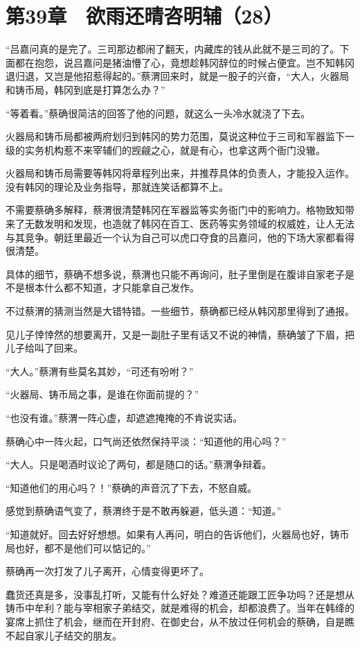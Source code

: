 \section{第39章　欲雨还晴咨明辅（28）}

“吕嘉问真的是完了。三司那边都闹了翻天，内藏库的钱从此就不是三司的了。下面都在抱怨，说吕嘉问是猪油懵了心，竟想趁韩冈辞位的时候占便宜。岂不知韩冈退归退，又岂是他招惹得起的。”蔡渭回来时，就是一股子的兴奋，“大人，火器局和铸币局，韩冈到底是打算怎么办？”

“等着看。”蔡确很简洁的回答了他的问题，就这么一头冷水就浇了下去。

火器局和铸币局都被两府划归到韩冈的势力范围，莫说这种位于三司和军器监下一级的实务机构惹不来宰辅们的觊觎之心，就是有心，也拿这两个衙门没辙。

火器局和铸币局需要等韩冈将章程列出来，并推荐具体的负责人，才能投入运作。没有韩冈的理论及业务指导，那就连笑话都算不上。

不需要蔡确多解释，蔡渭很清楚韩冈在军器监等实务衙门中的影响力。格物致知带来了无数发明和发现，也造就了韩冈在百工、医药等实务领域的权威姓，让人无法与其竞争。朝廷里最近一个认为自己可以虎口夺食的吕嘉问，他的下场大家都看得很清楚。

具体的细节，蔡确不想多说，蔡渭也只能不再询问，肚子里倒是在腹诽自家老子是不是根本什么都不知道，才只能拿自己发作。

不过蔡渭的猜测当然是大错特错。一些细节，蔡确都已经从韩冈那里得到了通报。

见儿子悻悻然的想要离开，又是一副肚子里有话又不说的神情，蔡确皱了下眉，把儿子给叫了回来。

“大人。”蔡渭有些莫名其妙，“可还有吩咐？”

“火器局、铸币局之事，是谁在你面前提的？”

“也没有谁。”蔡渭一阵心虚，却遮遮掩掩的不肯说实话。

蔡确心中一阵火起，口气尚还依然保持平淡：“知道他的用心吗？”

“大人。只是喝酒时议论了两句，都是随口的话。”蔡渭争辩着。

“知道他们的用心吗？！”蔡确的声音沉了下去，不怒自威。

感觉到蔡确语气变了，蔡渭终于是不敢再躲避，低头道：“知道。”

“知道就好。回去好好想想。如果有人再问，明白的告诉他们，火器局也好，铸币局也好，都不是他们可以惦记的。”

蔡确再一次打发了儿子离开，心情变得更坏了。

蠢货还真是多，没事乱打听，又能有什么好处？难道还能跟工匠争功吗？还是想从铸币中牟利？能与宰相家子弟结交，就是难得的机会，却都浪费了。当年在韩绛的宴席上抓住了机会，继而在开封府、在御史台，从不放过任何机会的蔡确，自是瞧不起自家儿子结交的朋友。

